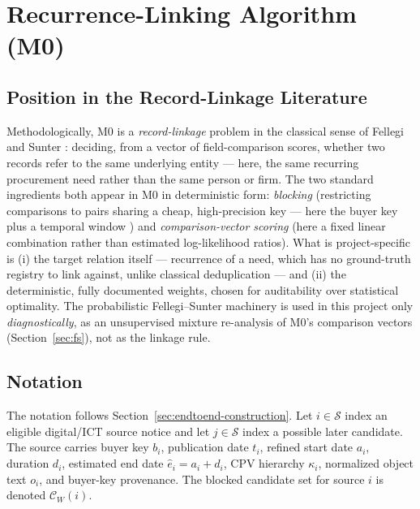 \documentclass[11pt]{article}
\begin{document}
\section{Recurrence-Linking Algorithm (M0)}
\label{sec:algo}

\subsection{Position in the Record-Linkage Literature}
Methodologically, M0 is a \emph{record-linkage} problem in the classical
sense of Fellegi and Sunter \cite{fellegi1969}: deciding, from a vector of
field-comparison scores, whether two records refer to the same underlying
entity --- here, the same recurring procurement need rather than the same
person or firm. The two standard ingredients both appear in M0 in
deterministic form: \emph{blocking} (restricting comparisons to pairs
sharing a cheap, high-precision key --- here the buyer key plus a temporal
window \cite{christen2012}) and \emph{comparison-vector scoring} (here a
fixed linear combination rather than estimated log-likelihood ratios).
What is project-specific is (i) the target relation itself --- recurrence
of a need, which has no ground-truth registry to link against, unlike
classical deduplication --- and (ii) the deterministic, fully documented
weights, chosen for auditability over statistical optimality. The
probabilistic Fellegi--Sunter machinery is used in this project only
\emph{diagnostically}, as an unsupervised mixture re-analysis of M0's
comparison vectors (Section~\ref{sec:fs}), not as the linkage rule.

\subsection{Notation}
The notation follows Section~\ref{sec:endtoend-construction}. Let
$i\in\mathcal{S}$ index an eligible digital/ICT source notice and let
$j\in\mathcal{S}$ index a possible later candidate. The source carries buyer
key $b_i$, publication date $t_i$, refined start date $a_i$, duration $d_i$,
estimated end date $\hat e_i=a_i+d_i$, CPV hierarchy $\kappa_i$, normalized
object text $o_i$, and buyer-key provenance. The blocked candidate set for
source $i$ is denoted $\mathcal{C}_W(i)$.
\end{document}
